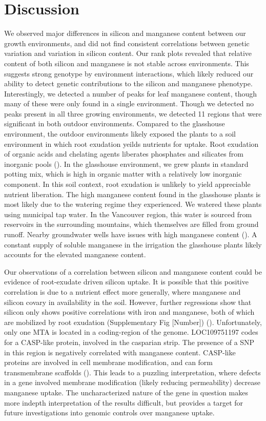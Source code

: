\documentclass[12pt, letterpaper, ]{report}
\begin{document}
\section{Discussion}

We observed major differences in silicon and manganese content between our growth environments, and did not find consistent correlations between genetic variation and variation in silicon content. Our rank plots revealed that relative content of both silicon and manganese is not stable across environments. This suggests strong genotype by environment interactions, which likely reduced our ability to detect genetic contributions to the silicon and manganese phenotype. Interestingly, we detected a number of peaks for leaf manganese content, though many of these were only found in a single environment. Though we detected no peaks present in all three growing environments, we detected 11 regions that were significant in both outdoor environments. Compared to the glasshouse environment, the outdoor environments likely exposed the plants to a soil environment in which root exudation yeilds nutrients for uptake. Root exudation of organic acids and chelating agents liberates phosphates and silicates from inorganic pools (\cite{de_tombeur_silicon_2021-1,lambers_plant_2008}). In the glasshouse environment, we grew plants in standard potting mix, which is high in organic matter with a relatively low inorganic component. In this soil context, root exudation is unlikely to yield appreciable nutrient liberation. The high manganese content found in the glasshouse plants is most likely due to the watering regime they experienced. We watered these plants using municipal tap water. In the Vancouver region, this water is sourced from reservoirs in the surrounding mountains, which themselves are filled from ground runoff. Nearby groundwater wells have issues with high manganese content (\cite{hu_drinking_2020}). A constant supply of soluble manganese in the irrigation the glasshouse plants likely accounts for the elevated manganese content. 

Our observations of a correlation between silicon and manganese content could be evidence of root-exudate driven silicon uptake. It is possible that this positive correlation is due to a nutrient effect more generally, where manganese and silicon covary in availability in the soil. However, further regressions show that silicon only shows positive correlations with iron and manganese, both of which are mobilized by root exudation (Supplementary Fig [Number]) (\cite{de_tombeur_silicon_2021-1}). Unfortunately, only one MTA is located in a coding-region of the genome. LOC109751197 codes for a CASP-like protein, involved in the casparian strip. The presence of a SNP in this region is negatively correlated with manganese content. CASP-like proteins are involved in cell membrane modification, and can form transmembrane scaffolds (\cite{roppolo_functional_2014}). This leads to a puzzling interpretation, where defects in a gene involved membrane modification (likely reducing permeability) decrease manganese uptake.  The uncharacterized nature of the gene in question makes more indepth interpretation of the results difficult, but provides a target for future investigations into genomic controls over manganese uptake.
\end{document}
